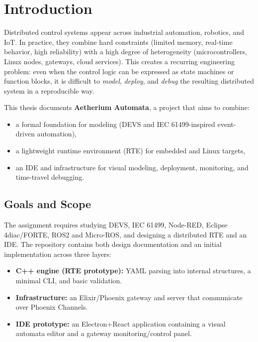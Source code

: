 
% 


\chapter{Introduction}

Distributed control systems appear across industrial automation, robotics, and IoT.
In practice, they combine hard constraints (limited memory, real-time behavior, high reliability) with a high degree of heterogeneity (microcontrollers, Linux nodes, gateways, cloud services).
This creates a recurring engineering problem: even when the control logic can be expressed as state machines or function blocks, it is difficult to \emph{model}, \emph{deploy}, and \emph{debug} the resulting distributed system in a reproducible way.

This thesis documents \textbf{Aetherium Automata}, a project that aims to combine:
\begin{itemize}
  \item a formal foundation for modeling (DEVS and IEC 61499-inspired event-driven automation),
  \item a lightweight runtime environment (RTE) for embedded and Linux targets,
  \item an IDE and infrastructure for visual modeling, deployment, monitoring, and time-travel debugging.
\end{itemize}

\section{Goals and Scope}

The assignment requires studying DEVS, IEC 61499, Node-RED, Eclipse 4diac/FORTE, ROS2 and Micro-ROS, and designing a distributed RTE and an IDE.
The repository contains both design documentation and an initial implementation across three layers:
\begin{itemize}
  \item \textbf{C++ engine (RTE prototype):} YAML parsing into internal structures, a minimal CLI, and basic validation.
  \item \textbf{Infrastructure:} an Elixir/Phoenix gateway and server that communicate over Phoenix Channels.
  \item \textbf{IDE prototype:} an Electron+React application containing a visual automata editor and a gateway monitoring/control panel.
\end{itemize}

